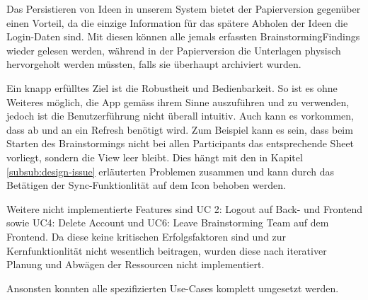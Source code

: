 Das Persistieren von Ideen in unserem System bietet der Papierversion gegenüber einen Vorteil, da die einzige Information für das spätere Abholen der Ideen die Login-Daten sind. Mit diesen können alle jemals erfassten BrainstormingFindings wieder gelesen werden, während in der Papierversion die Unterlagen physisch hervorgeholt werden müssten, falls sie überhaupt archiviert wurden.  

Ein knapp erfülltes Ziel ist die Robustheit und Bedienbarkeit. So ist es ohne Weiteres möglich, die App gemäss ihrem Sinne auszuführen und zu verwenden, jedoch ist die Benutzerführung nicht überall intuitiv. Auch kann es vorkommen, dass ab und an ein Refresh benötigt wird. Zum Beispiel kann es sein, dass beim Starten des Brainstormings nicht bei allen Participants das entsprechende Sheet vorliegt, sondern die View leer bleibt. Dies hängt mit den in Kapitel \ref{subsub:design-issue} erläuterten Problemen zusammen und kann durch das Betätigen der Sync-Funktionlität auf dem Icon behoben werden. 

Weitere nicht implementierte Features sind UC 2: Logout auf Back- und Frontend sowie UC4: Delete Account und UC6: Leave Brainstorming Team auf dem Frontend. Da diese keine kritischen Erfolgsfaktoren sind und zur Kernfunktionlität nicht wesentlich beitragen, wurden diese nach iterativer Planung und Abwägen der Ressourcen nicht implementiert.

Ansonsten konnten alle spezifizierten Use-Cases komplett umgesetzt werden.